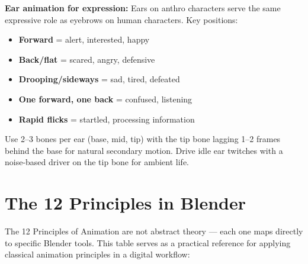 \begin{furrybox}
\textbf{Ear animation for expression:} Ears on anthro characters serve the same expressive role as eyebrows on human characters. Key positions:

\begin{itemize}[leftmargin=1.5em]
  \item \textbf{Forward} = alert, interested, happy
  \item \textbf{Back/flat} = scared, angry, defensive
  \item \textbf{Drooping/sideways} = sad, tired, defeated
  \item \textbf{One forward, one back} = confused, listening
  \item \textbf{Rapid flicks} = startled, processing information
\end{itemize}

Use 2--3 bones per ear (base, mid, tip) with the tip bone lagging 1--2 frames behind the base for natural secondary motion. Drive idle ear twitches with a noise-based driver on the tip bone for ambient life.
\end{furrybox}


\section{The 12 Principles in Blender}
\label{sec:12-principles}

The 12 Principles of Animation are not abstract theory --- each one maps directly to specific Blender tools. This table serves as a practical reference for applying classical animation principles in a digital workflow:

